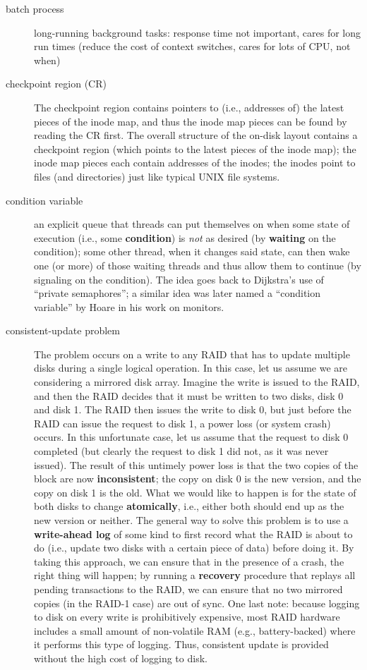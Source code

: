 \begin{description}
\item[batch process] long-running background tasks: response time not important, cares for long run times (reduce the cost of context switches, cares for lots of CPU, not when)

\item[checkpoint region (CR)] The checkpoint region contains pointers to (i.e., addresses of) the latest pieces of the inode map, and thus the inode map pieces can be found by reading the CR first. The overall structure of the on-disk layout contains a checkpoint region (which points to the latest pieces of the inode map); the inode map pieces each contain addresses of the inodes; the inodes point to files (and directories) just like typical UNIX file systems.

\item[condition variable] an explicit queue that threads can put themselves on when some state of execution (i.e., some \textbf{condition}) is \emph{not} as desired (by \textbf{waiting} on the condition); some other thread, when it changes said state, can then wake one (or more) of those waiting threads and thus allow them to continue (by signaling on the condition). The idea goes back to Dijkstra's use of ``private semaphores''; a similar idea was later named a ``condition variable'' by Hoare in his work on monitors.

\item[consistent-update problem] The problem occurs on a write to any RAID that has to update multiple disks during a single logical operation. In this case, let us assume we are considering a mirrored disk array. Imagine the write is issued to the RAID, and then the RAID decides that
it must be written to two disks, disk 0 and disk 1. The RAID then issues
the write to disk 0, but just before the RAID can issue the request to disk
1, a power loss (or system crash) occurs. In this unfortunate case, let us
assume that the request to disk 0 completed (but clearly the request to
disk 1 did not, as it was never issued).
The result of this untimely power loss is that the two copies of the block
are now \textbf{inconsistent}; the copy on disk 0 is the new version, and the copy
on disk 1 is the old. What we would like to happen is for the state of both
disks to change \textbf{atomically}, i.e., either both should end up as the new
version or neither.
The general way to solve this problem is to use a \textbf{write-ahead log} of some
kind to first record what the RAID is about to do (i.e., update two disks
with a certain piece of data) before doing it. By taking this approach, we
can ensure that in the presence of a crash, the right thing will happen; by
running a \textbf{recovery} procedure that replays all pending transactions to the
RAID, we can ensure that no two mirrored copies (in the RAID-1 case)
are out of sync.
One last note: because logging to disk on every write is prohibitively
expensive, most RAID hardware includes a small amount of non-volatile
RAM (e.g., battery-backed) where it performs this type of logging. Thus,
consistent update is provided without the high cost of logging to disk.


\end{description}
